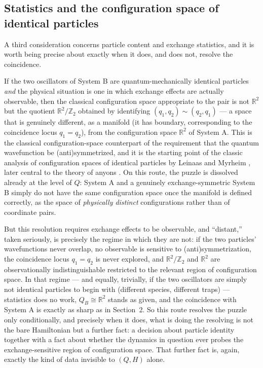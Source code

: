 \documentclass[11pt]{article}
\begin{document}
\subsection{Statistics and the configuration space of identical particles}

A third consideration concerns particle content and exchange statistics, and it is worth being precise about exactly when it does, and does not, resolve the coincidence.

If the two oscillators of System B are quantum-mechanically identical particles \emph{and} the physical situation is one in which exchange effects are actually observable, then the classical configuration space appropriate to the pair is not $\mathbb{R}^2$ but the quotient $\mathbb{R}^2/\mathbb{Z}_2$ obtained by identifying $(q_1,q_2)\sim(q_2,q_1)$ --- a space that is genuinely different, as a manifold (it has boundary, corresponding to the coincidence locus $q_1=q_2$), from the configuration space $\mathbb{R}^2$ of System A. This is the classical configuration-space counterpart of the requirement that the quantum wavefunction be (anti)symmetrized, and it is the starting point of the classic analysis of configuration spaces of identical particles by Leinaas and Myrheim \cite{LeinaasMyrheim1977}, later central to the theory of anyons \cite{Wilczek1982}. On this route, the puzzle is dissolved already at the level of $Q$: System A and a genuinely exchange-symmetric System B simply do not have the same configuration space once the manifold is defined correctly, as the space of \emph{physically distinct} configurations rather than of coordinate pairs.

But this resolution requires exchange effects to be observable, and ``distant,'' taken seriously, is precisely the regime in which they are not: if the two particles' wavefunctions never overlap, no observable is sensitive to (anti)symmetrization, the coincidence locus $q_1=q_2$ is never explored, and $\mathbb{R}^2/\mathbb{Z}_2$ and $\mathbb{R}^2$ are observationally indistinguishable restricted to the relevant region of configuration space. In that regime --- and equally, trivially, if the two oscillators are simply not identical particles to begin with (different species, different traps) --- statistics does no work, $Q_B\cong\mathbb{R}^2$ stands as given, and the coincidence with System A is exactly as sharp as in Section~2. So this route resolves the puzzle only conditionally, and precisely when it does, what is doing the resolving is not the bare Hamiltonian but a further fact: a decision about particle identity together with a fact about whether the dynamics in question ever probes the exchange-sensitive region of configuration space. That further fact is, again, exactly the kind of data invisible to $(Q,H)$ alone.
\end{document}
